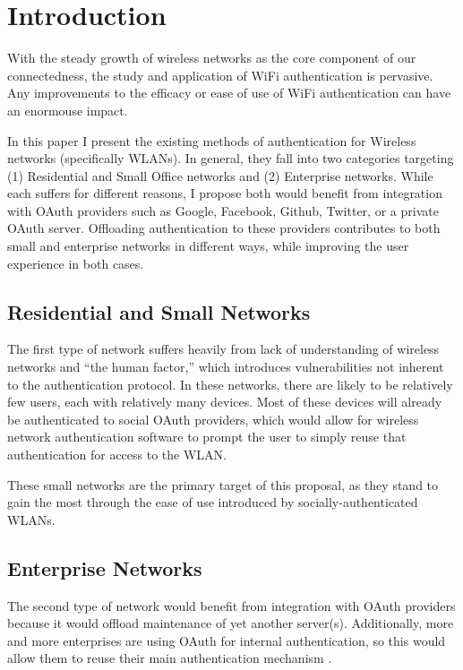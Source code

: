 \section{Introduction}
\label{section:introduction}
With the steady growth of wireless networks as the core component of our connectedness, the study
and application of WiFi authentication is pervasive. Any improvements to the efficacy or ease of use
of WiFi authentication can have an enormouse impact.

In this paper I present the existing methods of authentication for Wireless networks (specifically
WLANs). In general, they fall into two categories targeting (1) Residential and Small Office
networks and (2) Enterprise networks. While each suffers for different reasons, I propose both would
benefit from integration with OAuth providers such as Google, Facebook, Github, Twitter, or a
private OAuth server. Offloading authentication to these providers contributes to both small and
enterprise networks in different ways, while improving the user experience in both cases.

\subsection{Residential and Small Networks}
The first type of network suffers heavily from lack of understanding of wireless networks and
``the human factor,'' which introduces vulnerabilities not inherent to the authentication protocol.
In these networks, there are likely to be relatively few users, each with relatively many devices.
Most of these devices will already be authenticated to social OAuth providers, which would allow
for wireless network authentication software to prompt the user to simply reuse that authentication
for access to the WLAN.

These small networks are the primary target of this proposal, as they stand to gain the most through
the ease of use introduced by socially-authenticated WLANs.

\subsection{Enterprise Networks}
The second type of network would benefit from integration with OAuth providers because it would
offload maintenance of yet another server(s). Additionally, more and more enterprises are using
OAuth for internal authentication, so this would allow them to reuse their main authentication
mechanism \cite{todo:OAuthEnterprise}.